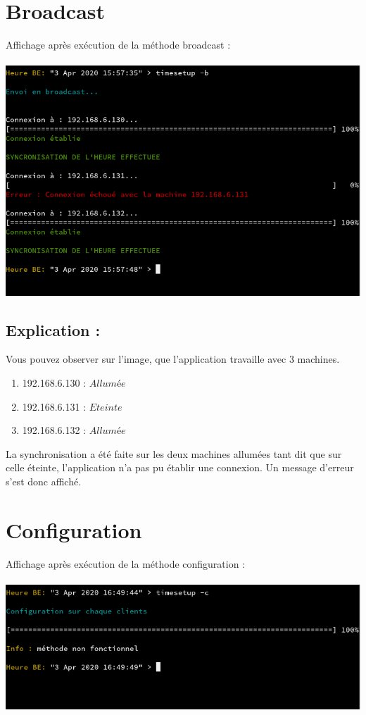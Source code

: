 \documentclass[a4paper,11pt]{report}
\begin{document}
\newpage
\section{Broadcast}
Affichage après exécution de la méthode broadcast :
\\
\\
\includegraphics[width=1\textwidth]{ressources/images/screenBroadcastAPK.PNG}
\subsection{Explication :}
Vous pouvez observer sur l'image, que l’application travaille avec 3 machines.
\begin{enumerate}
  \item 192.168.6.130 : \color{green}$Allumée$\color{black}
  \item 192.168.6.131 : \color{red}$Eteinte$\color{black}
  \item 192.168.6.132 : \color{green}$Allumée$\color{black}
\end{enumerate}
La synchronisation a été faite sur les deux machines allumées tant dit que sur celle éteinte, l’application n’a pas pu établir une connexion. Un message d’erreur s’est donc affiché.

\newpage
\section{Configuration}
Affichage après exécution de la méthode configuration :
\\
\\
\includegraphics[width=1\textwidth]{ressources/images/screenConfigurationAPK.PNG}
\end{document}
